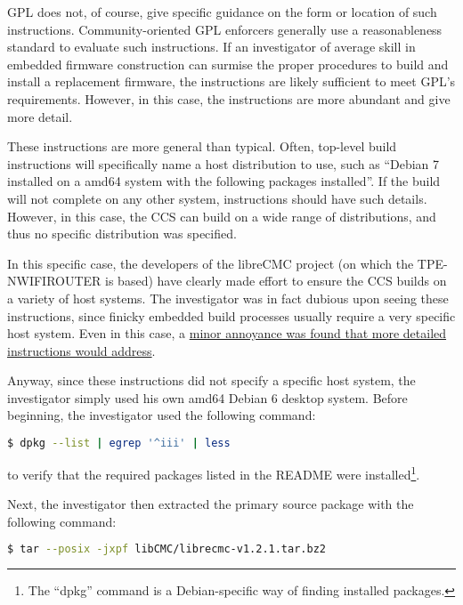 GPL does not, of course, give specific guidance on the form or location of
such instructions.  Community-oriented GPL enforcers generally use a
reasonableness standard to evaluate such instructions.  If an investigator of
average skill in embedded firmware construction can surmise the proper
procedures to build and install a replacement firmware, the instructions are
likely sufficient to meet GPL's requirements.  However, in this case, the
instructions are more abundant and give more detail.

These instructions are more general than typical.  Often, top-level build
instructions will specifically name a host distribution to use, such as
``Debian 7 installed on a amd64 system with the following packages
installed''.  If the build will not complete on any other system,
instructions should have such details.  However, in this case, the CCS can
build on a wide range of distributions, and thus no specific distribution was
specified.

\label{thinkpenguin-specific-host-system}

In this specific case, the developers of the libreCMC project (on which the
TPE-NWIFIROUTER is based) have clearly made effort to ensure the CCS builds
on a variety of host systems.  The investigator was in fact dubious upon
seeing these instructions, since finicky embedded build processes usually
require a very specific host system.   Even in this case, a
\hyperref[thinkpenguin-glibc-214-issue]{minor annoyance was found that more
  detailed instructions would address}.

Anyway, since these instructions did not specify a specific host system, the
investigator simply used his own amd64 Debian 6 desktop system.  Before
beginning, the investigator used the following command:

\lstset{tabsize=2}
\begin{lstlisting}[language=bash]
  $ dpkg --list | egrep '^iii' | less
\end{lstlisting}

to verify that the required packages listed in the README were
installed\footnote{The ``dpkg'' command is a Debian-specific way of
  finding installed packages.}.


Next, the investigator then extracted the primary source package with the
following command:

\lstset{tabsize=2}
\begin{lstlisting}[language=bash]
  $ tar --posix -jxpf libCMC/librecmc-v1.2.1.tar.bz2
\end{lstlisting}

